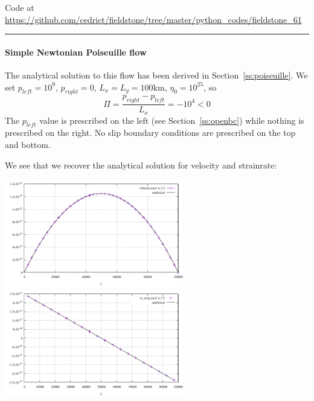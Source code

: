 

\begin{center}
Code at \url{https://github.com/cedrict/fieldstone/tree/master/python_codes/fieldstone_61}
\end{center}

\par\noindent\rule{\textwidth}{0.4pt}

\paragraph{Simple Newtonian Poiseuille flow} The analytical solution to this flow has been derived 
in Section~\ref{ss:poiseuille}.
We set $p_{left}=10^9$, $p_{right}=0$, $L_x=L_y=100$km, $\eta_0=10^{25}$, so 
\[
\Pi=\frac{p_{right}-p_{left}}{L_x}=-10^4 <0
\]
The $p_{left}$ value is prescribed on the left (see Section~\ref{ss:openbc}) while 
nothing is prescribed on the right. No slip boundary conditions are 
prescribed on the top and bottom.

We see that we recover the analytical solution for velocity and strainrate:
\begin{center}
\includegraphics[width=7.8cm]{python_codes/fieldstone_61/results/poiseuille/velocity}
\includegraphics[width=7.8cm]{python_codes/fieldstone_61/results/poiseuille/exy}
\end{center}

